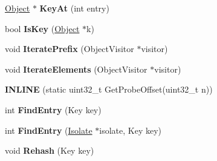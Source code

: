 \begin{DoxyCompactItemize}
\item 
\hypertarget{classv8_1_1internal_1_1_hash_table_a2ed7d2eea2cfcf271002606e9ccf003c}{}\hyperlink{classv8_1_1internal_1_1_object}{Object} $\ast$ {\bfseries Key\+At} (int entry)\label{classv8_1_1internal_1_1_hash_table_a2ed7d2eea2cfcf271002606e9ccf003c}

\item 
\hypertarget{classv8_1_1internal_1_1_hash_table_a2a52f99734a8c7fa8bf2098906c79948}{}bool {\bfseries Is\+Key} (\hyperlink{classv8_1_1internal_1_1_object}{Object} $\ast$k)\label{classv8_1_1internal_1_1_hash_table_a2a52f99734a8c7fa8bf2098906c79948}

\item 
\hypertarget{classv8_1_1internal_1_1_hash_table_a835cf648c19ee8608823136bff338527}{}void {\bfseries Iterate\+Prefix} (Object\+Visitor $\ast$visitor)\label{classv8_1_1internal_1_1_hash_table_a835cf648c19ee8608823136bff338527}

\item 
\hypertarget{classv8_1_1internal_1_1_hash_table_ac4d068c9ee95b536a49aa6388d21a97a}{}void {\bfseries Iterate\+Elements} (Object\+Visitor $\ast$visitor)\label{classv8_1_1internal_1_1_hash_table_ac4d068c9ee95b536a49aa6388d21a97a}

\item 
\hypertarget{classv8_1_1internal_1_1_hash_table_a5751428d9c3a2db8f27d0f7ca430b8bc}{}{\bfseries I\+N\+L\+I\+N\+E} (static uint32\+\_\+t Get\+Probe\+Offset(uint32\+\_\+t n))\label{classv8_1_1internal_1_1_hash_table_a5751428d9c3a2db8f27d0f7ca430b8bc}

\item 
\hypertarget{classv8_1_1internal_1_1_hash_table_aebd11697b3709b8e33c273ccdea46133}{}int {\bfseries Find\+Entry} (Key key)\label{classv8_1_1internal_1_1_hash_table_aebd11697b3709b8e33c273ccdea46133}

\item 
\hypertarget{classv8_1_1internal_1_1_hash_table_aaea324054c41c8f16af82c8281b9096e}{}int {\bfseries Find\+Entry} (\hyperlink{classv8_1_1internal_1_1_isolate}{Isolate} $\ast$isolate, Key key)\label{classv8_1_1internal_1_1_hash_table_aaea324054c41c8f16af82c8281b9096e}

\item 
\hypertarget{classv8_1_1internal_1_1_hash_table_a8e2c6cf3cc16c95c4a6a2dd693db186c}{}void {\bfseries Rehash} (Key key)\label{classv8_1_1internal_1_1_hash_table_a8e2c6cf3cc16c95c4a6a2dd693db186c}

\end{DoxyCompactItemize}
